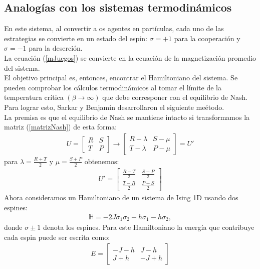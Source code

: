 \documentclass[letterpaper,12pt,oneside]{book}
\begin{document}
\subsection{Analog\'ias con los sistemas termodin\'amicos}
En este sistema, al convertir a os agentes en part\'iculas, cada uno de las estrategias se convierte en un estado del esp\'in: $\sigma = +1$ para la cooperaci\'on y $\sigma = -1$ para la deserci\'on.\\
La ecuaci\'on (\ref{mJuegos}) se convierte en la ecuaci\'on de la magnetizaci\'on promedio del sistema. \\
El objetivo principal es, entonces, encontrar el Hamiltoniano del sistema. 
Se pueden comprobar los c\'alculos termodin\'amicos al tomar el l\'imite de la temperatura cr\'itica $(\beta \to \infty)$ que debe corresponer con el equilibrio de Nash.
Para lograr esto, Sarkar y Benjamin \cite{benjamin}  desarrollaron el siguiente me\'etodo.\\
La premisa es que el equilibrio de Nash se mantiene intacto si transformamos la matriz (\ref{matrizNash}) de esta forma:
%
\begin{eqnarray}
  U =
  \begin{bmatrix}
    R & S\\
    T & P
  \end{bmatrix} \to 
  \begin{bmatrix}
    R - \lambda & S - \mu \\
    T - \lambda & P - \mu
  \end{bmatrix} = U'
\end{eqnarray}
%
para $\lambda = \frac{R+T}{2}$ y $\mu = \frac{S+P}{2}$ obtenemos: 
%
\begin{eqnarray}
U' = 
\begin{bmatrix}
  \frac{R-T}{2} & \frac{S-P}{2}\\
  \frac{T-R}{2} & \frac{P-S}{2} 
\end{bmatrix} \label{payoff}
\end{eqnarray}
%
Ahora consideramos un Hamiltoniano de un sistema de Ising 1D usando dos espines: 
%
\begin{eqnarray}
  \mathbb{H}=-2J \sigma_1 \sigma_2 -h\sigma_1 - h\sigma_2, \label{hamilNash}
\end{eqnarray}
%
donde $\sigma \pm 1$  denota los espines. Para este Hamiltoniano la energ\'ia que contribuye cada espin puede ser escrita como:
%
\begin{eqnarray}
  E = \begin{bmatrix}
    -J - h & J- h\\
    J+ h & -J + h
  \end{bmatrix}
\end{eqnarray}
\end{document}
